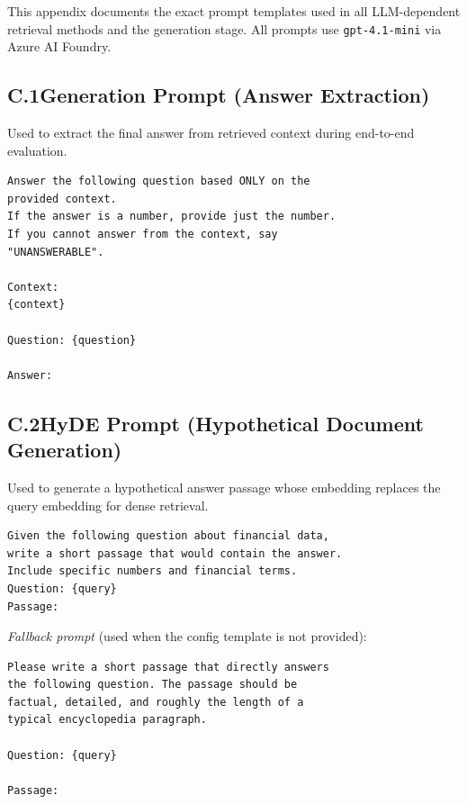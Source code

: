 \documentclass[11pt]{article}
\begin{document}
This appendix documents the exact prompt templates used in all LLM-dependent retrieval methods and the generation stage. All prompts use \texttt{gpt-4.1-mini} via Azure AI Foundry.

\subsection*{C.1\quad Generation Prompt (Answer Extraction)}

Used to extract the final answer from retrieved context during end-to-end evaluation.

\begin{small}
\begin{verbatim}
Answer the following question based ONLY on the
provided context.
If the answer is a number, provide just the number.
If you cannot answer from the context, say
"UNANSWERABLE".

Context:
{context}

Question: {question}

Answer:
\end{verbatim}
\end{small}

\subsection*{C.2\quad HyDE Prompt (Hypothetical Document Generation)}

Used to generate a hypothetical answer passage whose embedding replaces the query embedding for dense retrieval.

\begin{small}
\begin{verbatim}
Given the following question about financial data,
write a short passage that would contain the answer.
Include specific numbers and financial terms.
Question: {query}
Passage:
\end{verbatim}
\end{small}

\noindent\textit{Fallback prompt} (used when the config template is not provided):

\begin{small}
\begin{verbatim}
Please write a short passage that directly answers
the following question. The passage should be
factual, detailed, and roughly the length of a
typical encyclopedia paragraph.

Question: {query}

Passage:
\end{verbatim}
\end{small}
\end{document}
